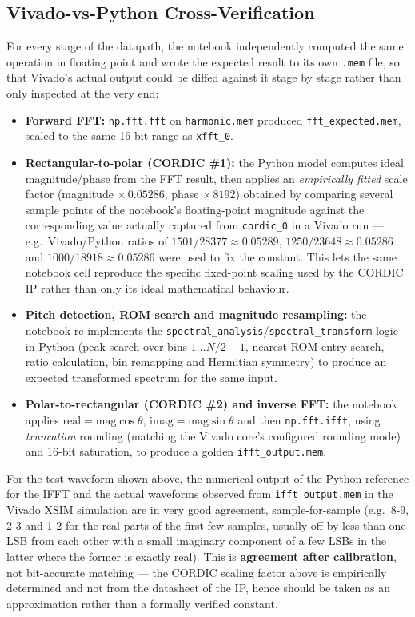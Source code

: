 \documentclass[conference,a4paper]{IEEEtran}
\begin{document}
\subsection{Vivado-vs-Python Cross-Verification}
For every stage of the datapath, the notebook independently computed the same operation in
floating point and wrote the expected result to its own \texttt{.mem} file, so that Vivado's
actual output could be diffed against it stage by stage rather than only inspected at the
very end:
\begin{itemize}
    \item \textbf{Forward FFT:} \texttt{np.fft.fft} on \texttt{harmonic.mem} produced
    \texttt{fft\_expected.mem}, scaled to the same 16-bit range as \texttt{xfft\_0}.
    \item \textbf{Rectangular-to-polar (CORDIC \#1):} the Python model computes ideal
    magnitude/phase from the FFT result, then applies an \emph{empirically fitted} scale
    factor (magnitude $\times\,0.05286$, phase $\times\,8192$) obtained by comparing several
    sample points of the notebook's floating-point magnitude against the corresponding value
    actually captured from \texttt{cordic\_0} in a Vivado run --- e.g.\ Vivado/Python ratios
    of $1501/28377\approx0.05289$, $1250/23648\approx0.05286$ and $1000/18918\approx0.05286$
    were used to fix the constant. This lets the same notebook cell reproduce the specific
    fixed-point scaling used by the CORDIC IP rather than only its ideal mathematical
    behaviour.
    \item \textbf{Pitch detection, ROM search and magnitude resampling:} the notebook
    re-implements the \texttt{spectral\_analysis}/\texttt{spectral\_transform} logic in
    Python (peak search over bins $1 \ldots N/2-1$, nearest-ROM-entry search, ratio
    calculation, bin remapping and Hermitian symmetry) to produce an expected transformed
    spectrum for the same input.
    \item \textbf{Polar-to-rectangular (CORDIC \#2) and inverse FFT:} the notebook applies
    $\text{real} = \text{mag}\cos\theta$, $\text{imag} = \text{mag}\sin\theta$ and then
    \texttt{np.fft.ifft}, using \emph{truncation} rounding (matching the Vivado core's
    configured rounding mode) and 16-bit saturation, to produce a golden
    \texttt{ifft\_output.mem}.
\end{itemize}
For the test waveform shown above, the numerical output of the Python reference for the IFFT and
the actual waveforms observed from \texttt{ifft\_output.mem} in the Vivado XSIM simulation
are in very good agreement, sample-for-sample (e.g.\ 8-9, 2-3 and 1-2 for the real parts of the
first few samples, usually off by less than one LSB from each other with a small imaginary
component of a few LSBs in the latter where the former is exactly real).
This is \textbf{agreement after calibration}, not bit-accurate matching --- the CORDIC scaling
factor above is empirically determined and not from the datasheet of the IP, hence should be
taken as an approximation rather than a formally verified constant.
\end{document}
